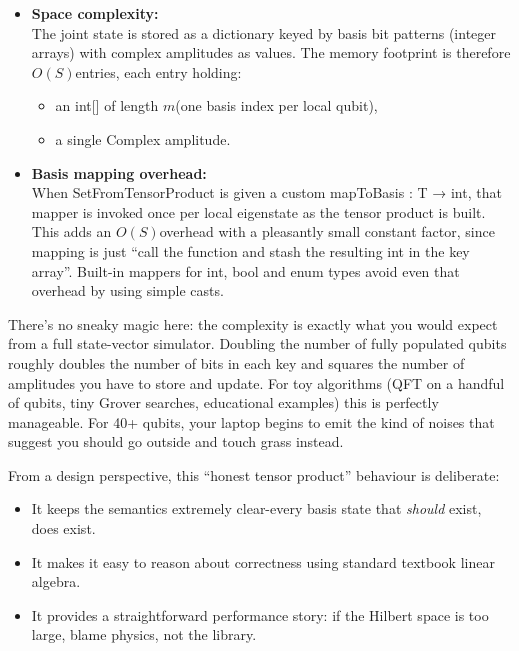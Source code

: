 \documentclass[a4paper,11pt]{article}
\begin{document}
\begin{itemize}
\item
  \textbf{Space complexity:}\\
  The joint state is stored as a dictionary keyed by basis bit patterns (integer arrays) with complex amplitudes as values. The memory footprint is therefore \(O(S)\)entries, each entry holding:

  \begin{itemize}
  \item
    an int{[}{]} of length \(m\)(one basis index per local qubit),
  \item
    a single Complex amplitude.
  \end{itemize}
\item
  \textbf{Basis mapping overhead:}\\
  When SetFromTensorProduct is given a custom mapToBasis : T → int, that mapper is invoked once per local eigenstate as the tensor product is built. This adds an \(O(S)\)overhead with a pleasantly small constant factor, since mapping is just ``call the function and stash the resulting int in the key array''. Built-in mappers for int, bool and enum types avoid even that overhead by using simple casts.
\end{itemize}

There's no sneaky magic here: the complexity is exactly what you would expect from a full state-vector simulator. Doubling the number of fully populated qubits roughly doubles the number of bits in each key and squares the number of amplitudes you have to store and update. For toy algorithms (QFT on a handful of qubits, tiny Grover searches, educational examples) this is perfectly manageable. For 40+ qubits, your laptop begins to emit the kind of noises that suggest you should go outside and touch grass instead.

From a design perspective, this ``honest tensor product'' behaviour is deliberate:

\begin{itemize}
\item
  It keeps the semantics extremely clear-every basis state that \emph{should} exist, does exist.
\item
  It makes it easy to reason about correctness using standard textbook linear algebra.
\item
  It provides a straightforward performance story: if the Hilbert space is too large, blame physics, not the library.
\end{itemize}
\end{document}

